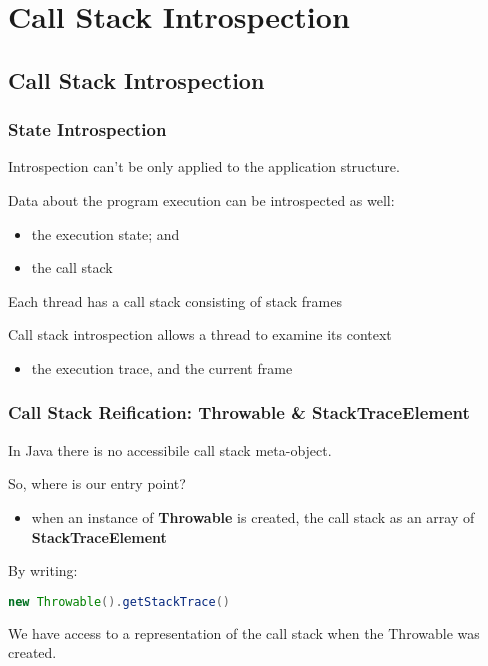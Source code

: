 \section{Call Stack Introspection}

\subsection{Call Stack Introspection}

\subsubsection{State Introspection}

Introspection can't be only applied to the application structure.

Data about the program execution can be introspected as well:
\begin{itemize}
	\item the execution state; and
	\item the call stack
\end{itemize}

Each thread has a call stack consisting of stack frames

Call stack introspection allows a thread to examine its context
\begin{itemize}
	\item the execution trace, and the current frame
\end{itemize}

\subsubsection{Call Stack Reification: Throwable \& StackTraceElement}

In Java there is no accessibile call stack meta-object.

So, where is our entry point?
\begin{itemize}
	\item when an instance of \textbf{Throwable} is created, the call stack as an array of \textbf{StackTraceElement}
\end{itemize}

By writing:
\begin{lstlisting}[language=Java]
new Throwable().getStackTrace()
\end{lstlisting}

We have access to a representation of the call stack when the Throwable was created.

